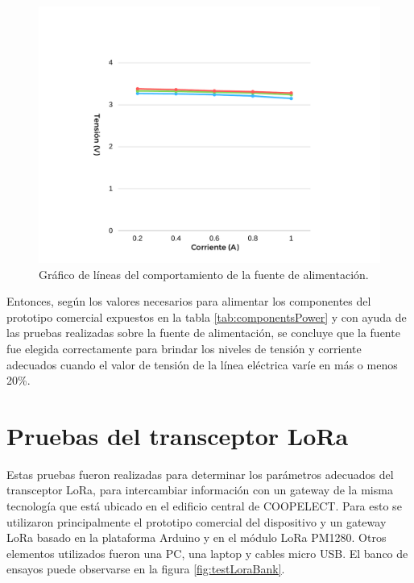 \begin{figure}[ht]
	\centering
	\includegraphics[scale=0.43]{./Figures/test_power_graph.pdf}
	\caption{Gráfico de líneas del comportamiento de la fuente de alimentación.}
	\label{fig:testPowerGraph}
\end{figure}

Entonces, según los valores necesarios para alimentar los componentes del prototipo comercial expuestos en la tabla \ref{tab:componentsPower} y con ayuda de las pruebas realizadas sobre la fuente de alimentación, se concluye que la fuente fue elegida correctamente para brindar los niveles de tensión y corriente adecuados cuando el valor de tensión de la línea eléctrica varíe en más o menos 20\%.


\section{Pruebas del transceptor LoRa}

Estas pruebas fueron realizadas para determinar los parámetros adecuados del transceptor LoRa, para intercambiar información con un gateway de la misma tecnología que está ubicado en el edificio central de COOPELECT. Para esto se utilizaron principalmente el prototipo comercial del dispositivo y un gateway LoRa basado en la plataforma Arduino y en el módulo LoRa PM1280. Otros elementos utilizados fueron una PC, una laptop y cables micro USB. El banco de ensayos puede observarse en la figura \ref{fig:testLoraBank}.

